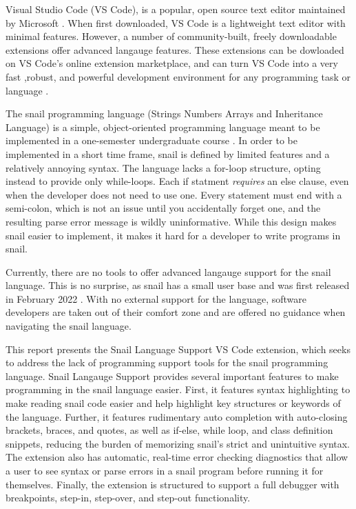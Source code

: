 \documentclass{article}
\begin{document}
Visual Studio Code (VS Code), is a popular, open source text editor maintained by Microsoft \cite{StackOverflow_2022,Microsoft_2023a}. When first downloaded, VS Code is a lightweight text editor with minimal features. However, a number of community-built, freely downloadable extensions offer advanced langauge features. These extensions can be dowloaded on VS Code's online extension marketplace, and can turn VS Code into a very fast ,robust, and powerful development environment for any programming task or language \cite{Microsoft_2023b}. 

The snail programming language (Strings Numbers Arrays and Inheritance Language) is a simple, object-oriented programming language meant to be implemented in a one-semester undergraduate course \cite{Angstadt_2023a}. In order to be implemented in a short time frame, snail is defined by limited features and a relatively annoying syntax. The language lacks a for-loop structure, opting instead to provide only while-loops. Each if statment \emph{requires} an else clause, even when the developer does not need to use one. Every statement must end with a semi-colon, which is not an issue until you accidentally forget one, and the resulting parse error message is wildly uninformative. While this design makes snail easier to implement, it makes it hard for a developer to write programs in snail.

Currently, there are no tools to offer advanced langauge support for the snail language. This is no surprise, as snail has a small user base and was first released in February 2022 \cite{Angstadt_2023b}. With no external support for the language, software developers are taken out of their comfort zone and are offered no guidance when navigating the snail language.

This report presents the Snail Language Support VS Code extension, which seeks to address the lack of programming support tools for the snail programming language. Snail Langauge Support provides several important features to make programming in the snail language easier. First, it features syntax highlighting to make reading snail code easier and help highlight key structures or keywords of the language. Further, it features rudimentary auto completion with auto-closing brackets, braces, and quotes, as well as if-else, while loop, and class definition snippets, reducing the burden of memorizing snail's strict and unintuitive syntax. The extension also has automatic, real-time error checking diagnostics that allow a user to see syntax or parse errors in a snail program before running it for themselves. Finally, the extension is structured to support a full debugger with breakpoints, step-in, step-over, and step-out functionality. 
\end{document}
